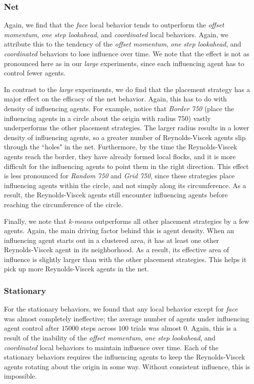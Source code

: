 \subsubsection*{Net}
Again, we find that the \textit{face} local behavior tends to outperform the
\textit{offset momentum}, \textit{one step lookahead}, and \textit{coordinated}
local behaviors.
Again, we attribute this to the tendency of the \textit{offset momentum},
\textit{one step lookahead}, and \textit{coordinated} behaviors to lose
influence over time.
We note that the effect is not as pronounced here as in our \textit{large}
experiments, since each influencing agent has to control fewer agents.

In contrast to the \textit{large} experiments, we do find that the placement
strategy has a major effect on the efficacy of the net behavior.
Again, this has to do with density of influencing agents.
For example, notice that \textit{Border 750} (place the influencing agents in a
circle about the origin with radius $750$) vastly underperforms the other
placement strategies.
The larger radius results in a lower density of influencing agents, so a greater
number of Reynolds-Viscek agents slip through the ``holes" in the net.
Furthermore, by the time the Reynolds-Viscek agents reach the border, they have already
formed local flocks, and it is more difficult for the influencing agents to
point them in the right direction.
This effect is less pronounced for \textit{Random 750} and \textit{Grid 750},
since these strategies place influencing agents within the circle, and not simply
along its circumference.
As a result, the Reynolds-Viscek agents still encounter influencing agents before
reaching the circumference of the circle.

Finally, we note that \textit{k-means} outperforms all other placement strategies
by a few agents.
Again, the main driving factor behind this is agent density.
When an influencing agent starts out in a clustered area, it has at least one
other Reynolds-Viscek agent in its neighborhood.
As a result, its effective area of influence is slightly larger than with the
other placement strategies.
This helps it pick up more Reynolds-Viscek agents in the net.

\subsubsection*{Stationary}
For the stationary behaviors, we found that any local behavior except for
\textit{face} was almost completely ineffective; the average number of agents
under influencing agent control after $15000$ steps across $100$ trials was
almost $0$.
Again, this is a result of the inability of the \textit{offset momentum},
\textit{one step lookahead}, and \textit{coordinated} local behaviors to
maintain influence over time.
Each of the stationary behaviors requires the influencing agents to keep the
Reynolds-Viscek agents rotating about the origin in some way.
Without consistent influence, this is impossible.

